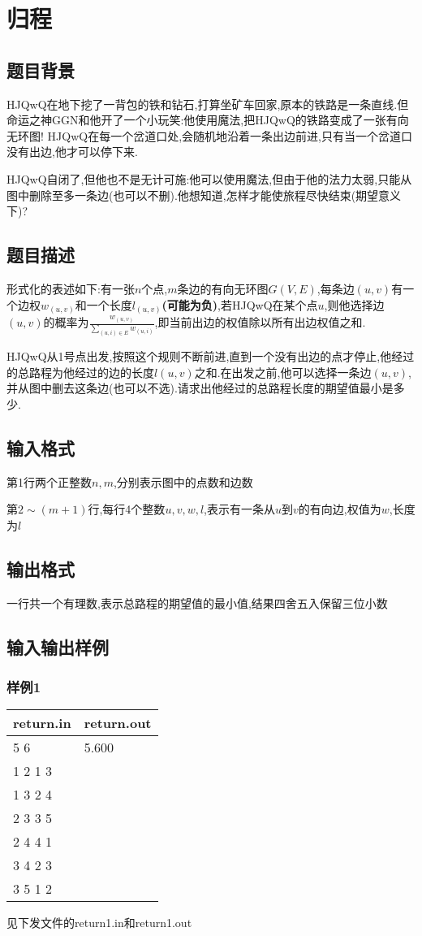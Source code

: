 \documentclass[12pt]{ctexart}
\begin{document}
\section{归程}
\subsection{题目背景}
HJQwQ在地下挖了一背包的铁和钻石,打算坐矿车回家,原本的铁路是一条直线.但命运之神GGN和他开了一个小玩笑:他使用魔法,把HJQwQ的铁路变成了一张有向无环图! HJQwQ在每一个岔道口处,会随机地沿着一条出边前进,只有当一个岔道口没有出边,他才可以停下来.

HJQwQ自闭了,但他也不是无计可施:他可以使用魔法,但由于他的法力太弱,只能从图中删除至多一条边(也可以不删).他想知道,怎样才能使旅程尽快结束(期望意义下)?
\subsection{题目描述}
形式化的表述如下:有一张$n$个点,$m$条边的有向无环图$G(V,E)$,每条边$(u,v)$有一个边权$w_{(u,v)}$和一个长度$l_{(u,v)}$\textbf{(可能为负)},若HJQwQ在某个点$u$,则他选择边$(u,v)$的概率为$\frac{w_{(u,v)}}{\sum\limits_{(u,i)\in E}w_{(u,i)}}$,即当前出边的权值除以所有出边权值之和.

HJQwQ从1号点出发,按照这个规则不断前进,直到一个没有出边的点才停止,他经过的总路程为他经过的边的长度$l(u,v)$之和.在出发之前,他可以选择一条边$(u,v)$,并从图中删去这条边(也可以不选).请求出他经过的总路程长度的期望值最小是多少.
\subsection{输入格式}
第1行两个正整数$n,m$,分别表示图中的点数和边数

第$2\sim(m+1)$行,每行4个整数$u,v,w,l$,表示有一条从$u$到$v$的有向边,权值为$w$,长度为$l$
\subsection{输出格式}
一行共一个有理数,表示总路程的期望值的最小值,结果四舍五入保留三位小数
\subsection{输入输出样例}
\subsubsection{样例1}
\begin{center}
	\begin{tabular}{|p{6cm}|p{6cm}|}
		\hline return.in&return.out\\
		\hline	5 6&5.600\\
				1 2 1 3&\\
				1 3 2 4&\\
				2 3 3 5&\\
				2 4 4 1&\\
				3 4 2 3&\\
				3 5 1 2&\\
		\hline
	\end{tabular}
\end{center}
见下发文件的return1.in和return1.out
\end{document}
